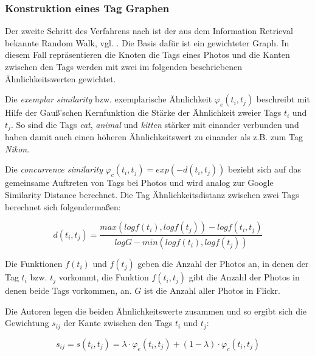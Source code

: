 




\subsubsection{Konstruktion eines Tag Graphen} %
\label{ssub:konstruktion_eines_tag_graphen}

Der zweite Schritt des Verfahrens nach \cite{ranking} ist der aus dem Information Retrieval bekannte Random Walk, vgl. \cite{bingLiu}. Die Basis dafür ist ein gewichteter Graph. In diesem Fall repräsentieren die Knoten die Tags eines Photos und die Kanten zwischen den Tags werden mit zwei im folgenden beschriebenen Ähnlichkeitswerten gewichtet.

Die \emph{exemplar similarity} bzw. exemplarische Ähnlichkeit $\varphi_e(t_i, t_j)$ beschreibt mit Hilfe der Gauß'schen Kernfunktion die Stärke der Ähnlichkeit zweier Tags $t_i$ und $t_j$. So sind die Tags \emph{cat}, \emph{animal} und \emph{kitten} stärker mit einander verbunden und haben damit auch einen höheren Ähnlichkeitswert zu einander als z.B. zum Tag \emph{Nikon}.

Die \emph{concurrence similarity} $\varphi_c(t_i, t_j) = exp(-d(t_i, t_j))$ bezieht sich auf das gemeinsame Auftreten von Tags bei Photos und wird analog zur Google Similarity Distance \cite{googleDistance} berechnet. Die Tag Ähnlichkeitsdistanz zwischen zwei Tags berechnet sich folgendermaßen:

\begin{figure}[hptb]
  \begin{equation}
  \label{fig:concurrenceDistance}
    d(t_i, t_j) = \frac{max(log f(t_i), log f(t_j)) - log f(t_i, t_j)}{log G - min(log f(t_i), log f(t_j))}
  \end{equation}
\end{figure}

Die Funktionen $f(t_i)$ und $f(t_j)$ geben die Anzahl der Photos an, in denen der Tag $t_i$ bzw. $t_j$ vorkommt, die Funktion $f(t_i, t_j)$ gibt die Anzahl der Photos in denen beide Tags vorkommen, an. $G$ ist die Anzahl aller Photos in Flickr.

Die Autoren legen die beiden Ähnlichkeitswerte zusammen und so ergibt sich die Gewichtung $s_{ij}$ der Kante zwischen den Tags $t_i$ und $t_j$:
\begin{figure}[hptb]
  \begin{equation}
  \label{fig:combinedSimilarity}
    s_{ij} = s(t_i, t_j) = \lambda \cdot \varphi_e(t_i, t_j) + (1 - \lambda) \cdot \varphi_c(t_i, t_j)
  \end{equation}
\end{figure}

